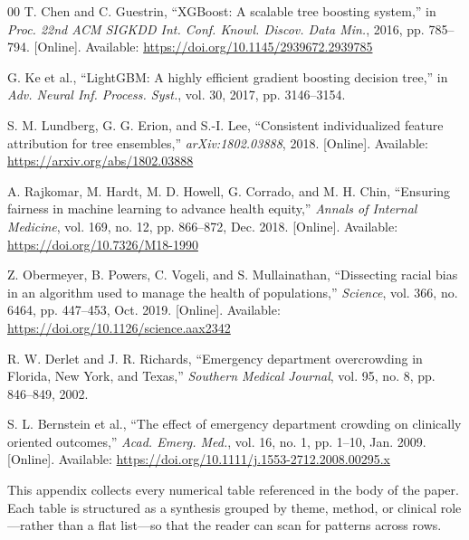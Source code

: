 \documentclass[conference]{IEEEtran}
\begin{document}
\begin{thebibliography}{00}
T. Chen and C. Guestrin, ``XGBoost: A scalable tree boosting system,'' in
\textit{Proc. 22nd ACM SIGKDD Int. Conf. Knowl. Discov. Data Min.}, 2016,
pp. 785--794. [Online]. Available:
\url{https://doi.org/10.1145/2939672.2939785}

G. Ke et al., ``LightGBM: A highly efficient gradient boosting decision
tree,'' in \textit{Adv. Neural Inf. Process. Syst.}, vol. 30, 2017,
pp. 3146--3154.


S. M. Lundberg, G. G. Erion, and S.-I. Lee, ``Consistent individualized
feature attribution for tree ensembles,'' \textit{arXiv:1802.03888}, 2018.
[Online]. Available: \url{https://arxiv.org/abs/1802.03888}

A. Rajkomar, M. Hardt, M. D. Howell, G. Corrado, and M. H. Chin, ``Ensuring
fairness in machine learning to advance health equity,'' \textit{Annals of
Internal Medicine}, vol. 169, no. 12, pp. 866--872, Dec. 2018. [Online].
Available: \url{https://doi.org/10.7326/M18-1990}

Z. Obermeyer, B. Powers, C. Vogeli, and S. Mullainathan, ``Dissecting racial
bias in an algorithm used to manage the health of populations,''
\textit{Science}, vol. 366, no. 6464, pp. 447--453, Oct. 2019. [Online].
Available: \url{https://doi.org/10.1126/science.aax2342}

R. W. Derlet and J. R. Richards, ``Emergency department overcrowding in
Florida, New York, and Texas,'' \textit{Southern Medical Journal}, vol. 95,
no. 8, pp. 846--849, 2002.

S. L. Bernstein et al., ``The effect of emergency department crowding on
clinically oriented outcomes,'' \textit{Acad. Emerg. Med.}, vol. 16, no. 1,
pp. 1--10, Jan. 2009. [Online]. Available:
\url{https://doi.org/10.1111/j.1553-2712.2008.00295.x}

\end{thebibliography}

\clearpage

\appendix
This appendix collects every numerical table referenced in the body of the
paper. Each table is structured as a synthesis grouped by theme, method, or
clinical role---rather than a flat list---so that the reader can scan for
patterns across rows.
\label{app:tables}
\end{document}
